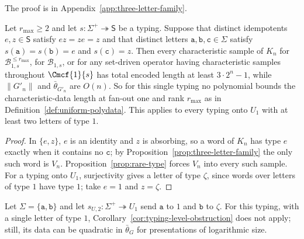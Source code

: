 The proof is in Appendix~\ref{app:three-letter-family}.


\begin{corollary}
\label{cor:typing-level-obstruction}
Let $r_{\max}\ge2$ and let $s:\Sigma^+\twoheadrightarrow\mathsf S$ be a typing.
Suppose that distinct idempotents $e,z\in\mathsf S$ satisfy $ez=ze=z$ and that
distinct letters $\mathtt a,\mathtt b,\mathtt c\in\Sigma$ satisfy
$s(\mathtt a)=s(\mathtt b)=e$ and $s(\mathtt c)=z$.  Then every characteristic
sample of $K_n$ for $\mathcal B^{\le r_{\max}}_{1,s}$, for $\mathcal B_{1,s}$, or for
any set-driven operator having characteristic samples throughout $\Cmcf{1}{s}$
has total encoded length at least $3\cdot2^n-1$, while $\|G'_n\|$ and
$\bar\theta_{G'_n}$ are $O(n)$.  So for this single typing no polynomial
bounds the characteristic-data length at fan-out one and rank $r_{\max}$ as in
Definition~\ref{def:uniform-polydata}.  This applies to every typing onto $U_1$
with at least two letters of type $1$.
\end{corollary}

\begin{proof}
In $\{e,z\}$, $e$ is an identity and $z$ is absorbing, so a word of $K_n$ has type
$e$ exactly when it contains no $\mathtt c$; by
Proposition~\ref{prop:three-letter-family} the only such word is $V_n$.
Proposition~\ref{prop:rare-type} forces $V_n$ into every such sample.  For a
typing onto $U_1$, surjectivity gives a letter of type $\zeta$, since words over
letters of type $1$ have type $1$; take $e=1$ and $z=\zeta$.
\end{proof}

Let $\Sigma=\{\mathtt a,\mathtt b\}$ and let $s_{U,2}:\Sigma^+\twoheadrightarrow U_1$ send $\mathtt a$ to
$1$ and $\mathtt b$ to $\zeta$.  For this typing, with a single letter of type $1$,
Corollary~\ref{cor:typing-level-obstruction} does not apply; still, its data can
be quadratic in $\bar\theta_G$ for presentations of logarithmic size.

